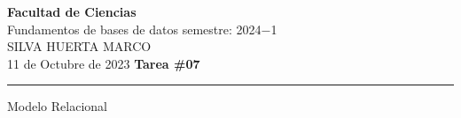 \documentclass[a4paper,12pt]{article}
\begin{document}
\pagecolor{black}
\color{white}

\thispagestyle{firstpage} %
\noindent
\large\textbf{Facultad de Ciencias} \\
Fundamentos de bases de datos \hfill semestre: 2024$-$1 \\
\textsc{SILVA HUERTA MARCO}   \hfill     \\
11 de Octubre de 2023      \hfill \textbf{Tarea \#07}    \\
\noindent\rule{7.3in}{2.8pt}

\begin{center}
    \Large{Modelo Relacional}
\end{center}
\end{document}
